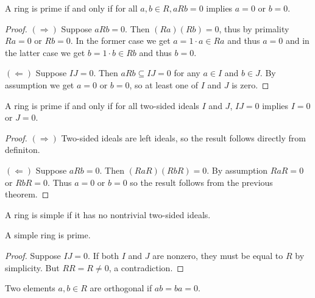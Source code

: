   \begin{theorem}
    \label{thm:prime_ring_equiv}
    A ring is prime if and only if for all $a, b \in R, aRb = 0$ implies $a = 0$ or $b = 0$.
  \end{theorem}
  \begin{proof}
    $(\Rightarrow)$ Suppose $aRb = 0$. Then $(Ra)(Rb) = 0$, thus by primality $Ra = 0$ or $Rb = 0$. In the former case we get $a = 1 \cdot a \in Ra$ and thus $a = 0$ and in the latter case we get $b = 1 \cdot b \in Rb$ and thus $b = 0$.

    $(\Leftarrow)$ Suppose $IJ = 0$. Then $aRb  \subseteq IJ = 0$ for any $a \in I$ and $b \in J$. By assumption we get $a = 0$ or $b = 0$, so at least one of $I$ and $J$ is zero.
  \end{proof}
  \begin{theorem}
    \label{thm:prime_ring_equiv'}
    A ring is prime if and only if for all two-sided ideals $I$ and $J$, $IJ = 0$ implies $I = 0$ or $J = 0$.
  \end{theorem}
  \begin{proof}
    $(\Rightarrow)$ Two-sided ideals are left ideals, so the result follows directly from definiton.

    $(\Leftarrow)$ Suppose $aRb = 0$. Then $(RaR)(RbR) = 0$. By assumption $RaR = 0$ or $RbR = 0$. Thus $a = 0$ or $b = 0$ so the result follows from the previous theorem.
  \end{proof}

  \begin{definition}
    A ring is simple if it has no nontrivial two-sided ideals.
  \end{definition}

  \begin{theorem}
    \label{thm:simple_ring_is_prime}
    A simple ring is prime.
  \end{theorem}
  \begin{proof}
    Suppose $IJ = 0$. If both $I$ and $J$ are nonzero, they must be equal to $R$ by simplicity. But $RR = R \neq 0$, a contradiction.
  \end{proof}

  \begin{definition}
    \label{def:is_semisimple}
    Two elements $a, b \in R$ are orthogonal if $ab = ba = 0$.
  \end{definition}

